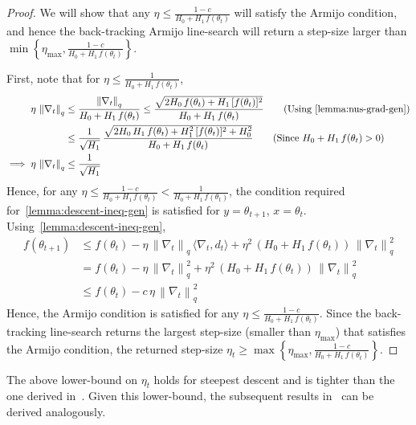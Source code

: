 \documentclass{article}
\newcommand{\normsq}[1]{\left\|#1 \right\|^{2}}
\newcommand{\norm}[1]{\left\|#1 \right\|}
\newcommand{\tht}{\theta_t}
\newcommand{\thtt}{\theta_{t+1}}
\newcommand{\etat}{{\eta_t}}
\begin{document}
\begin{proof}
We will show that any $\eta \leq \frac{1 - c}{H_0 + H_1 \, f(\tht)}$ will satisfy the Armijo condition, and hence the back-tracking Armijo line-search will return a step-size larger than $\min \left\{ \eta_{\max},\frac{1 - c}{H_0 + H_1 \, f(\tht)} \right\}$. 

First, note that for $\eta \leq \frac{1}{H_0 + H_1 \, f(\tht)}$, 
\begin{align*}
\eta \, \norm{\nabla_t}_{q} & \leq \frac{\norm{\nabla_t}_{q}}{H_0 + H_1 \, f(\tht)} \leq \frac{\sqrt{2 H_0 \, f(\tht) + H_1 \, [f(\tht)]^2}}{H_0 + H_1 \, f(\tht)} \tag{Using~\cref{lemma:nus-grad-gen}} \\
& \leq \frac{1}{\sqrt{H_1}} \, \frac{\sqrt{2 H_0 \, H_1 \, f(\tht) + H_1^2 \, [f(\tht)]^2 + H_0^2}}{H_0 + H_1 \, f(\tht)} \tag{Since $H_0 + H_1 \, f(\tht) > 0$} \\
\implies \eta \, \norm{\nabla_t}_{q}  & \leq \frac{1}{\sqrt{H_1}}
\end{align*}
Hence, for any $\eta \leq \frac{1-c}{H_0 + H_1 \, f(\tht)} < \frac{1}{H_0 + H_1 \, f(\tht)}$, the condition required for~\cref{lemma:descent-ineq-gen} is satisfied for $y = \thtt$, $x = \tht$. Using~\cref{lemma:descent-ineq-gen},
\begin{align*}
f(\thtt) & \leq f(\tht) - \eta \, \norm{\nabla_t}_{q} \, \langle \nabla_t, d_t \rangle + \eta^2 \, (H_0 + H_1 \, f(\tht)) \, \normsq{\nabla_t}_{q} \tag{Since $\norm{d_t}_p = 1$} \\
& =f(\tht) - \eta \, \normsq{\nabla_t}_{q} + \eta^2 \, (H_0 + H_1 \, f(\tht)) \, \normsq{\nabla_t}_{q} \tag{By definition of the dual norm} \\
& \leq f(\tht) - c \, \eta  \, \normsq{\nabla_t}_{q} \tag{By choice of $\eta$} 
\end{align*}
Hence, the Armijo condition is satisfied for any $\eta \leq \frac{1-c}{H_0 + H_1 \, f(\tht)}$. Since the back-tracking line-search returns the largest step-size (smaller than $\eta_{\max}$) that satisfies the Armijo condition, the returned step-size $\etat \geq \max\left\{\eta_{\max}, \frac{1-c}{H_0 + H_1 \, f(\tht)}\right\}$. 
\end{proof}
The above lower-bound on $\etat$ holds for steepest descent and is tighter than the one derived in~\citet{vaswani2025armijo}. Given this lower-bound, the subsequent results in~\citet{vaswani2025armijo} can be derived analogously. 
\end{document}
